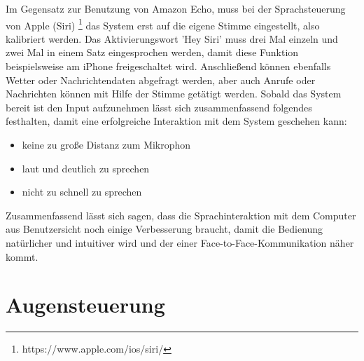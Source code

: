 Im Gegensatz zur Benutzung von Amazon Echo, muss bei der Sprachsteuerung von Apple (Siri)%
\footnote{https://www.apple.com/ios/siri/}
%
 das System erst auf die eigene Stimme eingestellt, also kalibriert werden. Das Aktivierungswort 'Hey Siri' muss drei Mal einzeln und zwei Mal in einem Satz eingesprochen werden, damit diese Funktion beispielsweise am iPhone freigeschaltet wird. Anschließend können ebenfalls Wetter oder Nachrichtendaten abgefragt werden, aber auch Anrufe oder Nachrichten können mit Hilfe der Stimme getätigt werden. 
\newline \newline
Sobald das System bereit ist den Input aufzunehmen lässt sich zusammenfassend folgendes festhalten, damit eine erfolgreiche Interaktion mit dem System geschehen kann:
\begin{itemize}
      \item keine zu große Distanz zum Mikrophon
      \item laut und deutlich zu sprechen
			\item nicht zu schnell zu sprechen
\end{itemize}
\vspace{\baselineskip}
Zusammenfassend lässt sich sagen, dass die Sprachinteraktion mit dem Computer aus Benutzersicht noch einige Verbesserung braucht, damit die Bedienung natürlicher und intuitiver wird und der einer Face-to-Face-Kommunikation näher kommt.

\section{Augensteuerung}
\label{cha:Augensteuerung}


